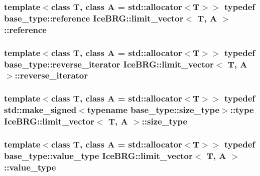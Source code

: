 \subsubsection[{reference}]{\setlength{\rightskip}{0pt plus 5cm}template$<$class T, class A = std\+::allocator$<$\+T$>$$>$ typedef base\+\_\+type\+::reference {\bf Ice\+B\+R\+G\+::limit\+\_\+vector}$<$ T, A $>$\+::{\bf reference}}\label{classIceBRG_1_1limit__vector_af3acb98a381ba86ca927f099591d1512}
\hypertarget{classIceBRG_1_1limit__vector_af4ba6b26317b4b6f8b0a5dc2e5a1d268}{}
\subsubsection[{reverse\+\_\+iterator}]{\setlength{\rightskip}{0pt plus 5cm}template$<$class T, class A = std\+::allocator$<$\+T$>$$>$ typedef base\+\_\+type\+::reverse\+\_\+iterator {\bf Ice\+B\+R\+G\+::limit\+\_\+vector}$<$ T, A $>$\+::{\bf reverse\+\_\+iterator}}\label{classIceBRG_1_1limit__vector_af4ba6b26317b4b6f8b0a5dc2e5a1d268}
\hypertarget{classIceBRG_1_1limit__vector_a81be3eb6cd519b3f5279ef735ccc4c2f}{}
\subsubsection[{size\+\_\+type}]{\setlength{\rightskip}{0pt plus 5cm}template$<$class T, class A = std\+::allocator$<$\+T$>$$>$ typedef std\+::make\+\_\+signed$<$typename base\+\_\+type\+::size\+\_\+type$>$\+::{\bf type} {\bf Ice\+B\+R\+G\+::limit\+\_\+vector}$<$ T, A $>$\+::{\bf size\+\_\+type}}\label{classIceBRG_1_1limit__vector_a81be3eb6cd519b3f5279ef735ccc4c2f}
\hypertarget{classIceBRG_1_1limit__vector_a9b1e2f022c18b0227b25bb571741bb28}{}
\subsubsection[{value\+\_\+type}]{\setlength{\rightskip}{0pt plus 5cm}template$<$class T, class A = std\+::allocator$<$\+T$>$$>$ typedef base\+\_\+type\+::value\+\_\+type {\bf Ice\+B\+R\+G\+::limit\+\_\+vector}$<$ T, A $>$\+::{\bf value\+\_\+type}}\label{classIceBRG_1_1limit__vector_a9b1e2f022c18b0227b25bb571741bb28}


